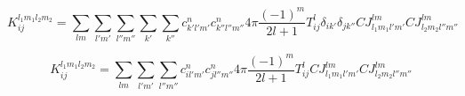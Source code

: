 \documentclass[nobibnotes, amssymb,aps,superscriptaddress]{revtex4-1}
\begin{document}
\begin{equation}
K_{ij}^{l_1m_1l_2m_2}=\sum_{lm}\sum_{l'm'}\sum_{l''m''}\sum_{k'}\sum_{k''} c_{k'l'm'}^n c_{k''l''m''}^n 4\pi \frac{(-1)^m}{2l+1} T^l_{ij} \delta_{ik'} \delta_{jk''} CJ_{l_1m_1l'm'}^{lm}CJ_{l_2m_2l''m''}^{lm} 
\end{equation}

\begin{equation}
K_{ij}^{l_1m_1l_2m_2}=\sum_{lm}\sum_{l'm'}\sum_{l''m''}c_{il'm'}^n c_{jl''m''}^n 4\pi \frac{(-1)^m}{2l+1} T^l_{ij} CJ_{l_1m_1l'm'}^{lm}CJ_{l_2m_2l''m''}^{lm}  
\end{equation}
\end{document}

